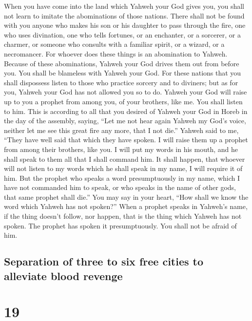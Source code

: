  When you have come into the land which Yahweh your God
gives you, you shall not learn to imitate the abominations of those
nations.  There shall not be found with you anyone who
makes his son or his daughter to pass through the fire, one who uses
divination, one who tells fortunes, or an enchanter, or a sorcerer,
 or a charmer, or someone who consults with a familiar
spirit, or a wizard, or a necromancer.  For whoever does
these things is an abomination to Yahweh. Because of these abominations,
Yahweh your God drives them out from before you.  You
shall be blameless with Yahweh your God.  For these
nations that you shall dispossess listen to those who practice sorcery
and to diviners; but as for you, Yahweh your God has not allowed you so
to do.  Yahweh your God will raise up to you a prophet
from among you, of your brothers, like me. You shall listen to him.
 This is according to all that you desired of Yahweh your
God in Horeb in the day of the assembly, saying, ``Let me not hear again
Yahweh my God's voice, neither let me see this great fire any more, that
I not die.''  Yahweh said to me, ``They have well said
that which they have spoken.  I will raise them up a
prophet from among their brothers, like you. I will put my words in his
mouth, and he shall speak to them all that I shall command him.
 It shall happen, that whoever will not listen to my
words which he shall speak in my name, I will require it of him.
 But the prophet who speaks a word presumptuously in my
name, which I have not commanded him to speak, or who speaks in the name
of other gods, that same prophet shall die.''  You may
say in your heart, ``How shall we know the word which Yahweh has not
spoken?''  When a prophet speaks in Yahweh's name, if the
thing doesn't follow, nor happen, that is the thing which Yahweh has not
spoken. The prophet has spoken it presumptuously. You shall not be
afraid of him.

\hypertarget{separation-of-three-to-six-free-cities-to-alleviate-blood-revenge}{%
\subsection{Separation of three to six free cities to alleviate blood
revenge}\label{separation-of-three-to-six-free-cities-to-alleviate-blood-revenge}}

\hypertarget{section-18}{%
\section{19}\label{section-18}}

